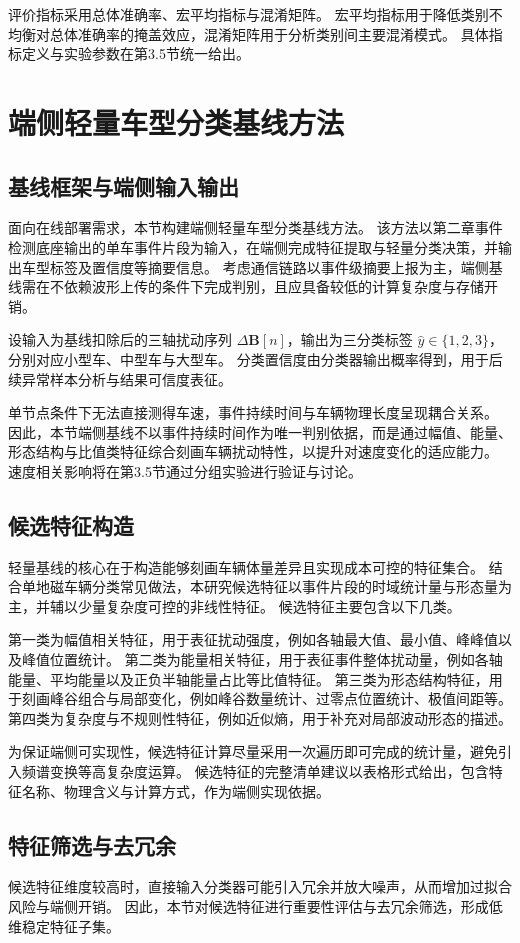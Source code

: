 \documentclass{xdupgthesis}
\begin{document}
评价指标采用总体准确率、宏平均指标与混淆矩阵。
宏平均指标用于降低类别不均衡对总体准确率的掩盖效应，混淆矩阵用于分析类别间主要混淆模式。
具体指标定义与实验参数在第3.5节统一给出。


\section{端侧轻量车型分类基线方法}

\subsection{基线框架与端侧输入输出}
面向在线部署需求，本节构建端侧轻量车型分类基线方法。
该方法以第二章事件检测底座输出的单车事件片段为输入，在端侧完成特征提取与轻量分类决策，并输出车型标签及置信度等摘要信息。
考虑通信链路以事件级摘要上报为主，端侧基线需在不依赖波形上传的条件下完成判别，且应具备较低的计算复杂度与存储开销。

设输入为基线扣除后的三轴扰动序列 $\Delta\mathbf{B}[n]$，输出为三分类标签 $\hat{y}\in\{1,2,3\}$，分别对应小型车、中型车与大型车。
分类置信度由分类器输出概率得到，用于后续异常样本分析与结果可信度表征。

单节点条件下无法直接测得车速，事件持续时间与车辆物理长度呈现耦合关系。
因此，本节端侧基线不以事件持续时间作为唯一判别依据，而是通过幅值、能量、形态结构与比值类特征综合刻画车辆扰动特性，以提升对速度变化的适应能力。
速度相关影响将在第3.5节通过分组实验进行验证与讨论。

\subsection{候选特征构造}
轻量基线的核心在于构造能够刻画车辆体量差异且实现成本可控的特征集合。
结合单地磁车辆分类常见做法，本研究候选特征以事件片段的时域统计量与形态量为主，并辅以少量复杂度可控的非线性特征。
候选特征主要包含以下几类。

第一类为幅值相关特征，用于表征扰动强度，例如各轴最大值、最小值、峰峰值以及峰值位置统计。
第二类为能量相关特征，用于表征事件整体扰动量，例如各轴能量、平均能量以及正负半轴能量占比等比值特征。
第三类为形态结构特征，用于刻画峰谷组合与局部变化，例如峰谷数量统计、过零点位置统计、极值间距等。
第四类为复杂度与不规则性特征，例如近似熵，用于补充对局部波动形态的描述。

为保证端侧可实现性，候选特征计算尽量采用一次遍历即可完成的统计量，避免引入频谱变换等高复杂度运算。
候选特征的完整清单建议以表格形式给出，包含特征名称、物理含义与计算方式，作为端侧实现依据。

\subsection{特征筛选与去冗余}
候选特征维度较高时，直接输入分类器可能引入冗余并放大噪声，从而增加过拟合风险与端侧开销。
因此，本节对候选特征进行重要性评估与去冗余筛选，形成低维稳定特征子集。
\end{document}
